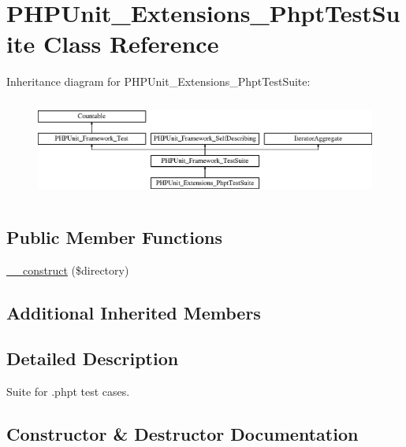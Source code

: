 \hypertarget{class_p_h_p_unit___extensions___phpt_test_suite}{}\section{P\+H\+P\+Unit\+\_\+\+Extensions\+\_\+\+Phpt\+Test\+Suite Class Reference}
\label{class_p_h_p_unit___extensions___phpt_test_suite}
Inheritance diagram for P\+H\+P\+Unit\+\_\+\+Extensions\+\_\+\+Phpt\+Test\+Suite\+:\begin{figure}[H]
\begin{center}
\leavevmode
\includegraphics[height=3.303835cm]{class_p_h_p_unit___extensions___phpt_test_suite}
\end{center}
\end{figure}
\subsection*{Public Member Functions}
\begin{DoxyCompactItemize}
\item 
\mbox{\hyperlink{class_p_h_p_unit___extensions___phpt_test_suite_a23418de26cc819cb1b9af57e8194b31e}{\+\_\+\+\_\+construct}} (\$directory)
\end{DoxyCompactItemize}
\subsection*{Additional Inherited Members}


\subsection{Detailed Description}
Suite for .phpt test cases. 

\subsection{Constructor \& Destructor Documentation}
\mbox{\label{class_p_h_p_unit___extensions___phpt_test_suite_a23418de26cc819cb1b9af57e8194b31e}} 
